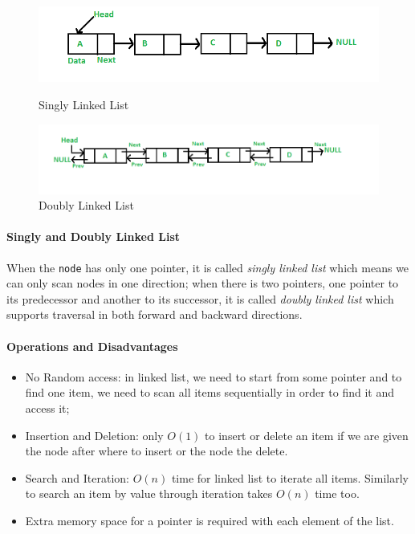 \documentclass[../main.tex]{subfiles}
\begin{document}
\begin{figure}[ht!]
    \centering
    \includegraphics[width=.7\columnwidth]{fig/linked_list1.png}
    \caption{Singly Linked List}
    \label{fig:singly_linkedlist}
        \includegraphics[width=0.9\columnwidth]{fig/DLL1.png}
    \caption{Doubly Linked List}
\end{figure}

\paragraph{Singly and Doubly Linked List} When the \texttt{node} has only one pointer, it is called \textit{singly linked list} which means we can only scan nodes in one direction; when there is two pointers, one pointer to its predecessor and another to its successor, it is called \textit{doubly linked list} which supports traversal in both forward and backward directions. 

\paragraph{Operations and Disadvantages} 
\begin{itemize}
    \item No Random access: in linked list, we need to start from some pointer and to find one item, we need to scan all items sequentially in order to find it and access it;
    \item Insertion and Deletion: only $O(1)$ to insert or delete an item if we are given the node after where to insert or the node the delete.
    \item Search and Iteration: $O(n)$ time for linked list to iterate all items. Similarly to search an item by value through iteration takes $O(n)$ time too.
    \item Extra memory space for a pointer is required with each element of the list.
\end{itemize}
\end{document}
